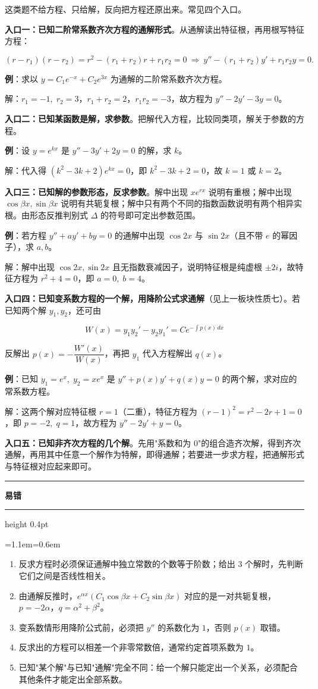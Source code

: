 \documentclass[11pt,openany,UTF8]{ctexbook}
\newcommand{\callouthead}[2]{%
  \par\addvspace{7pt}\noindent
  {\color{#1}\rule[-0.15em]{3pt}{1.05em}}\hspace{0.5em}%
  {\bfseries\color{#1}#2}\par\nobreak\vspace{-0.35em}%
  {\color{rulesep}\hrule height 0.4pt}\nobreak\vspace{0.45em}%
  \begingroup\small\setlength{\parindent}{0pt}%
  \leftskip=1.1em\rightskip=0.6em\noindent\ignorespaces}
\newcommand{\calloutend}{\par\endgroup\addvspace{7pt}}
\newenvironment{callwarn}[1]{\callouthead{warnbar}{#1}}{\calloutend}
\begin{document}
这类题不给方程、只给解，反向把方程还原出来。常见四个入口。

\textbf{入口一：已知二阶常系数齐次方程的通解形式}。从通解读出特征根，再用根写特征方程：

\[(r-r_1)(r-r_2)=r^{2}-(r_1+r_2)r+r_1r_2=0\ \Longrightarrow\ y''-(r_1+r_2)y'+r_1r_2y=0 .\]

\textbf{例}：求以 $y=C_1e^{-x}+C_2e^{3x}$ 为通解的二阶常系数齐次方程。

解：$r_1=-1,\;r_2=3$，$r_1+r_2=2$，$r_1r_2=-3$，故方程为 $y''-2y'-3y=0$。

\textbf{入口二：已知某函数是解，求参数}。把解代入方程，比较同类项，解关于参数的方程。

\textbf{例}：设 $y=e^{kx}$ 是 $y''-3y'+2y=0$ 的解，求 $k$。

解：代入得 $(k^{2}-3k+2)e^{kx}=0$，即 $k^{2}-3k+2=0$，故 $k=1$ 或 $k=2$。

\textbf{入口三：已知解的参数形态，反求参数}。解中出现 $xe^{rx}$ 说明有重根；解中出现 $\cos\beta x,\sin\beta x$ 说明有共轭复根；解中只有两个不同的指数函数说明有两个相异实根。由形态反推判别式 $\Delta$ 的符号即可定出参数范围。

\textbf{例}：若方程 $y''+ay'+by=0$ 的通解中出现 $\cos 2x$ 与 $\sin 2x$（且不带 $e$ 的幂因子），求 $a,b$。

解：解中出现 $\cos 2x,\sin 2x$ 且无指数衰减因子，说明特征根是纯虚根 $\pm 2i$，故特征方程为 $r^{2}+4=0$，即 $a=0,\;b=4$。

\textbf{入口四：已知变系数方程的一个解，用降阶公式求通解}（见上一板块性质七）。若已知两个解 $y_1,y_2$，还可由

\[W(x)=y_1y_2'-y_2y_1'=Ce^{-\int p(x)\,dx}\]

反解出 $p(x)=-\dfrac{W'(x)}{W(x)}$，再把 $y_1$ 代入方程解出 $q(x)$。

\textbf{例}：已知 $y_1=e^{x},\;y_2=xe^{x}$ 是 $y''+p(x)y'+q(x)y=0$ 的两个解，求对应的常系数方程。

解：这两个解对应特征根 $r=1$（二重），特征方程为 $(r-1)^{2}=r^{2}-2r+1=0$，即 $p=-2,\;q=1$，故方程为 $y''-2y'+y=0$。

\textbf{入口五：已知非齐次方程的几个解}。先用"系数和为 $0$"的组合造齐次解，得到齐次通解，再用其中任意一个解作为特解，即得通解；若要进一步求方程，把通解形式与特征根对应起来即可。

\begin{callwarn}{易错}
\begin{enumerate}
\item 反求方程时必须保证通解中独立常数的个数等于阶数；给出 3 个解时，先判断它们之间是否线性相关。
\item 由通解反推时，$e^{\alpha x}(C_1\cos\beta x+C_2\sin\beta x)$ 对应的是一对共轭复根，$p=-2\alpha$，$q=\alpha^{2}+\beta^{2}$。
\item 变系数情形用降阶公式前，必须把 $y''$ 的系数化为 $1$，否则 $p(x)$ 取错。
\item 反求出的方程可以相差一个非零常数倍，通常约定首项系数为 $1$。
\item 已知"某个解"与已知"通解"完全不同：给一个解只能定出一个关系，必须配合其他条件才能定出全部系数。
\end{enumerate}
\end{callwarn}
\end{document}
